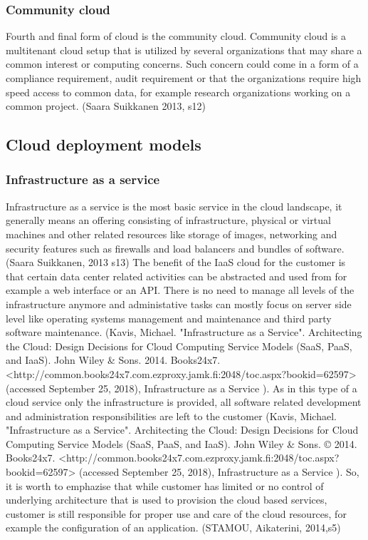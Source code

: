 \documentclass{article}
\begin{document}
\subsubsection{Community cloud}
Fourth and final form of cloud is the community cloud. Community cloud is a multitenant cloud setup that is utilized by several organizations that may share a common interest or computing concerns. Such concern could come in a form of a compliance requirement, audit requirement or that the organizations require high speed access to common data, for example research organizations working on a common project. (Saara Suikkanen 2013, s12)
\subsection{Cloud deployment models}
\subsubsection{Infrastructure as a service}
Infrastructure as a service is the most basic service in the cloud landscape, it generally means an offering consisting of infrastructure, physical or virtual machines and other related resources like storage of images, networking and security features such as firewalls and load balancers and bundles of software. (Saara Suikkanen, 2013 s13)
The benefit of the IaaS cloud for the customer is that certain data center related activities can be abstracted and used from for example a web interface or an API. There is no need to manage all levels of the infrastructure anymore and administative tasks can mostly focus on server side level like operating systems management and maintenance and third party software maintenance. (Kavis, Michael. "Infrastructure as a Service". Architecting the Cloud: Design Decisions for Cloud Computing Service Models (SaaS, PaaS, and IaaS). John Wiley \& Sons. 2014. Books24x7. <http://common.books24x7.com.ezproxy.jamk.fi:2048/toc.aspx?bookid=62597> (accessed September 25, 2018), Infrastructure as a Service ).
As in this type of a cloud service only the infrastructure is provided, all software related development and administration responsibilities are left to the customer (Kavis, Michael. "Infrastructure as a Service". Architecting the Cloud: Design Decisions for Cloud Computing Service Models (SaaS, PaaS, and IaaS). John Wiley \& Sons. © 2014. Books24x7. <http://common.books24x7.com.ezproxy.jamk.fi:2048/toc.aspx?bookid=62597> (accessed September 25, 2018), Infrastructure as a Service ).
So, it is worth to emphazise that while customer has limited or no control of underlying architecture that is used to provision the cloud based services, customer is still responsible for proper use and care of the cloud resources, for example the configuration of an application. (STAMOU, Aikaterini, 2014,s5)
\end{document}
